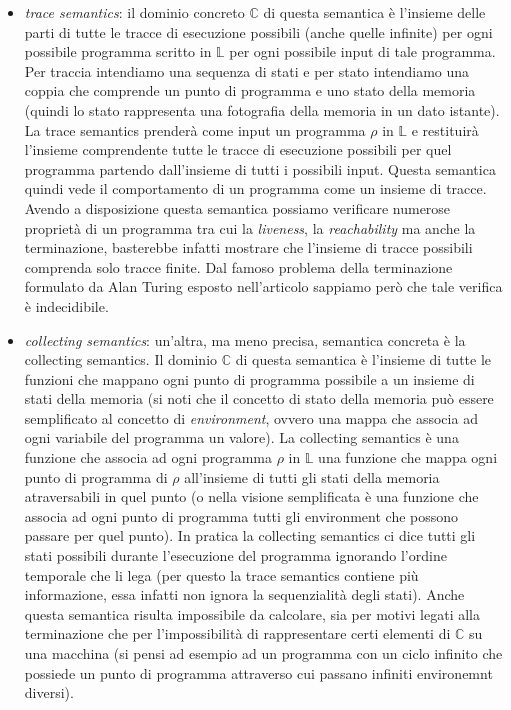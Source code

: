 \begin{itemize}
    \item \textit{trace semantics}: il dominio concreto \(\mathbb{C}\) di questa semantica è l'insieme delle parti di tutte le tracce di esecuzione possibili (anche quelle infinite) per ogni possibile programma scritto in \(\mathbb{L}\) per ogni possibile input di tale programma. Per traccia intendiamo una sequenza di stati e per stato intendiamo una coppia che comprende un punto di programma e uno stato della memoria (quindi lo stato rappresenta una fotografia della memoria in un dato istante). La trace semantics prenderà come input un programma \(\rho\) in \(\mathbb{L}\) e restituirà l'insieme comprendente tutte le tracce di esecuzione possibili per quel programma partendo dall'insieme di tutti i possibili input. Questa semantica quindi vede il comportamento di un programma come un insieme di tracce. Avendo a disposizione questa semantica possiamo verificare numerose proprietà di un programma tra cui la \textit{liveness}, la \textit{reachability} ma anche la terminazione, basterebbe infatti mostrare che l'insieme di tracce possibili comprenda solo tracce finite. Dal famoso problema della terminazione formulato da Alan Turing esposto nell'articolo \cite{DBLP:journals/x/Turing37} sappiamo però che tale verifica è indecidibile.
    \item \textit{collecting semantics}: un'altra, ma meno precisa, semantica concreta è la collecting semantics. Il dominio \(\mathbb{C}\) di questa semantica è l'insieme di tutte le funzioni che mappano ogni punto di programma possibile a un insieme di stati della memoria (si noti che il concetto di stato della memoria può essere semplificato al concetto di \textit{environment}, ovvero una mappa che associa ad ogni variabile del programma un valore). La collecting semantics è una funzione che associa ad ogni programma \(\rho\) in \(\mathbb{L}\) una funzione che mappa ogni punto di programma di \(\rho\) all'insieme di tutti gli stati della memoria atraversabili in quel punto (o nella visione semplificata è una funzione che associa ad ogni punto di programma tutti gli environment che possono passare per quel punto). In pratica la collecting semantics ci dice tutti gli stati possibili durante l'esecuzione del programma ignorando l'ordine temporale che li lega (per questo la trace semantics contiene più informazione, essa infatti non ignora la sequenzialità degli stati). Anche questa semantica risulta impossibile da calcolare, sia per motivi legati alla terminazione che per l'impossibilità di rappresentare certi elementi di \(\mathbb{C}\) su una macchina (si pensi ad esempio ad un programma con un ciclo infinito che possiede un punto di programma attraverso cui passano infiniti environemnt diversi). 
\end{itemize}

